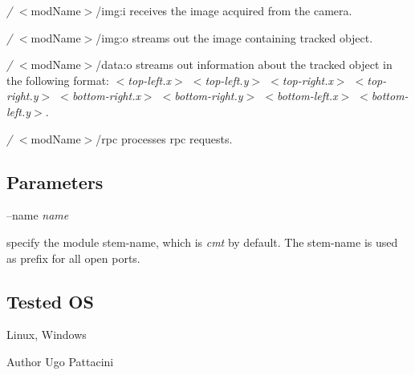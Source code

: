 \begin{DoxyItemize}
\item {\itshape /} $<$mod\+Name$>$/img\+:i receives the image acquired from the camera.
\item {\itshape /} $<$mod\+Name$>$/img\+:o streams out the image containing tracked object.
\item {\itshape /} $<$mod\+Name$>$/data\+:o streams out information about the tracked object in the following format\+: {\itshape $<$top-\/left.\+x$>$ $<$top-\/left.\+y$>$ $<$top-\/right.\+x$>$ $<$top-\/right.\+y$>$ $<$bottom-\/right.\+x$>$ $<$bottom-\/right.\+y$>$ $<$bottom-\/left.\+x$>$ $<$bottom-\/left.\+y$>$}.
\item {\itshape /} $<$mod\+Name$>$/rpc processes rpc requests.
\end{DoxyItemize}\hypertarget{group__icub__tld_parameters_sec}{}\subsection{Parameters}\label{group__icub__tld_parameters_sec}
--name {\itshape name} 
\begin{DoxyItemize}
\item specify the module stem-\/name, which is {\itshape cmt} by default. The stem-\/name is used as prefix for all open ports.
\end{DoxyItemize}\hypertarget{group__icub__tld_tested_os_sec}{}\subsection{Tested O\+S}\label{group__icub__tld_tested_os_sec}
Linux, Windows

\begin{DoxyAuthor}{Author}
Ugo Pattacini 
\end{DoxyAuthor}
